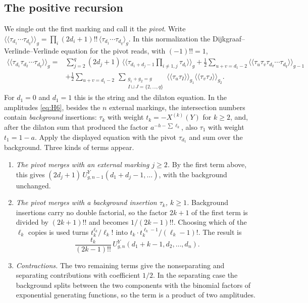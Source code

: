 \subsection{The positive recursion}\label{deriving-the-exact-positive-recursion}

We single out the first marking and call it the \emph{pivot}. Write
\(\langle\!\langle\tau_{d_1}\cdots\tau_{d_q}\rangle\!\rangle_g
=\prod_i(2d_i+1)!!\,\langle\tau_{d_1}\cdots\tau_{d_q}\rangle_g\).
In this normalization the Dijkgraaf--Verlinde--Verlinde equation for the
pivot reads, with \((-1)!!=1\),
\begin{equation*}
\begin{split}
\langle\!\langle\tau_{d_1}\tau_{d_2}\cdots\tau_{d_q}\rangle\!\rangle_g
={}&\sum_{j=2}^q(2d_j+1)\,
 \langle\!\langle\tau_{d_1+d_j-1}\textstyle\prod_{i\ne1,j}\tau_{d_i}\rangle\!\rangle_g
 +\frac12\sum_{u+v=d_1-2}
 \langle\!\langle\tau_u\tau_v\tau_{d_2}\cdots\tau_{d_q}\rangle\!\rangle_{g-1}\\
&+\frac12\sum_{u+v=d_1-2}\ \sum_{\substack{g_1+g_2=g\\ I\sqcup J=\{2,\ldots,q\}}}
 \langle\!\langle\tau_u\tau_I\rangle\!\rangle_{g_1}
 \langle\!\langle\tau_v\tau_J\rangle\!\rangle_{g_2}.
\end{split}
\end{equation*}
For \(d_1=0\) and \(d_1=1\) this is the string and the dilaton equation.
In the amplitudes \eqref{eq:H6}, besides the \(n\) external markings, the
intersection numbers contain \emph{background} insertions: \(\tau_k\) with
weight \(t_k=-X^{(k)}(Y)\) for \(k\ge2\), and, after the dilaton sum that
produced the factor \(a^{-h-\sum\ell_k}\), also \(\tau_1\) with weight
\(t_1=1-a\). Apply the displayed equation with the pivot \(\tau_{d_1}\)
and sum over the background. Three kinds of terms appear.

\begin{enumerate}[label=(\alph*),leftmargin=*]
\item \emph{The pivot merges with an external marking $j\ge2$.} By the
first term above, this gives \((2d_j+1)\,U^Y_{g,n-1}(d_1+d_j-1,\ldots)\),
with the background unchanged.
\item \emph{The pivot merges with a background insertion $\tau_k$,
$k\ge1$.} Background insertions carry no double factorial, so the
factor \(2k+1\) of the first term is divided by \((2k+1)!!\) and becomes
\(1/(2k-1)!!\). Choosing which of the
\(\ell_k\) copies is used turns \(t_k^{\ell_k}/\ell_k!\) into
\(t_k\cdot t_k^{\ell_k-1}/(\ell_k-1)!\). The result is
\[
\frac{t_k}{(2k-1)!!}\,U^Y_{g,n}(d_1+k-1,d_2,\ldots,d_n).
\]
\item \emph{Contractions.} The two remaining terms give the nonseparating
and separating contributions with coefficient \(1/2\). In the separating
case the background splits between the two components with the binomial
factors of exponential generating functions, so the term is a product of
two amplitudes.
\end{enumerate}


